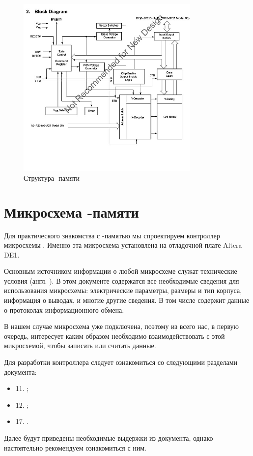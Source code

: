 \begin{figure}[H]
\centering
% 
\includegraphics[width=0.8\textwidth]{./images/lab_6/flash_block_diagram}
\caption{Структура -памяти }
\label{fig:flash_block_diagram}
\end{figure}

\section{Микросхема -памяти }

\par{Для практического знакомства с -памятью мы спроектируем контроллер микросхемы . Именно эта микросхема установлена на отладочной плате Altera DE1.}
\par{Основным источником информации о любой микросхеме служат технические условия (англ. ). В этом документе содержатся все необходимые сведения для использования микросхемы: электрические параметры, размеры и тип корпуса, информация о выводах, и многие другие сведения. В том числе  содержит данные о протоколах информационного обмена.}
\par{В нашем случае микросхема уже подключена, поэтому из всего  нас, в первую очередь, интересует каким образом необходимо взаимодействовать с этой микросхемой, чтобы записать или считать данные.}
\par{Для разработки контроллера следует ознакомиться со следующими разделами документа:
\begin{itemize}[noitemsep,label={}]
  \item 11. ;
  \item 12. ;
  \item 17. .
\end{itemize}}
\par{Далее будут приведены необходимые выдержки из документа, однако настоятельно рекомендуем ознакомиться с ним.}

